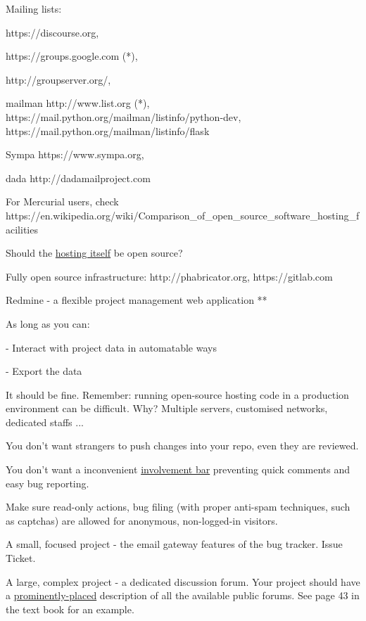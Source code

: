 \documentclass[landscape,30pt]{foils}
\begin{document}
Mailing lists:

https://discourse.org,

https://groups.google.com (*),

http://groupserver.org/,

mailman http://www.list.org (*),  https://mail.python.org/mailman/listinfo/python-dev, https://mail.python.org/mailman/listinfo/flask

Sympa https://www.sympa.org,

dada http://dadamailproject.com

For Mercurial users, check https://en.wikipedia.org/wiki/Comparison\_of\_open\_source\_software\_hosting\_facilities


Should the \underline{hosting itself} be open source?

Fully open source infrastructure: http://phabricator.org, https://gitlab.com

Redmine - a flexible project management web application ** 

As long as you can:

- Interact with project data in automatable ways

- Export the data

It should be fine.  Remember: running open-source hosting code in a production environment can be difficult.  Why? Multiple servers,
customised networks, dedicated staffs ...


You don't want strangers to push changes into your repo, even they are reviewed.

You don't want a inconvenient \underline{involvement bar} preventing quick comments and easy bug reporting.

Make sure read-only actions, bug filing (with proper anti-spam techniques, such as captchas) are allowed for anonymous, non-logged-in visitors.  


A small, focused project - the email gateway features of the bug tracker. Issue Ticket.

A large, complex project - a dedicated discussion forum.  Your project should have a \underline{prominently-placed} description of all the available public forums.  See page 43 in the text book for an example.
\end{document}
